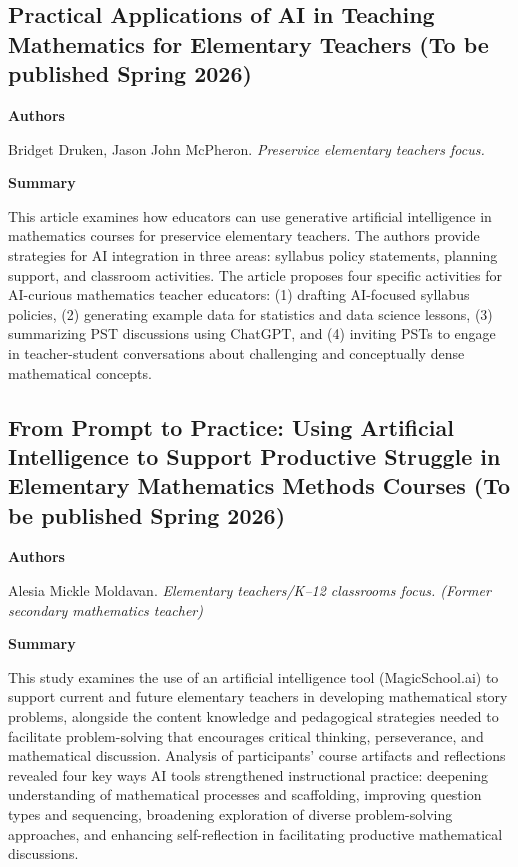 \documentclass[11pt, a4paper]{article}
\newenvironment{annotation}[1]
{\par\vspace{2pt}\noindent\textbf{#1}\par\vspace{1pt}\noindent\small\ignorespaces}
{\par\vspace{3pt}}
\begin{document}
\subsection[\texorpdfstring{Practical Applications of AI in Teaching Mathematics for Elementary Teachers }{Practical Applications of AI in Teaching Mathematics for Elementary Teachers }]{Practical Applications of AI in Teaching Mathematics for Elementary Teachers (To be published Spring 2026)}

\begin{annotation}{Authors}
Bridget Druken, Jason John McPheron. \textit{Preservice elementary teachers focus.}
\end{annotation}

\begin{annotation}{Summary}
This article examines how educators can use generative artificial intelligence in mathematics courses for preservice elementary teachers. The authors provide strategies for AI integration in three areas: syllabus policy statements, planning support, and classroom activities. The article proposes four specific activities for AI-curious mathematics teacher educators: (1) drafting AI-focused syllabus policies, (2) generating example data for statistics and data science lessons, (3) summarizing PST discussions using ChatGPT, and (4) inviting PSTs to engage in teacher-student conversations about challenging and conceptually dense mathematical concepts.
\end{annotation}


\subsection[\texorpdfstring{From Prompt to Practice: Using Artificial Intelligence to Support Productive Struggle in Elementary Mathematics Methods Courses }{From Prompt to Practice: Using Artificial Intelligence to Support Productive Struggle in Elementary Mathematics Methods Courses }]{From Prompt to Practice: Using Artificial Intelligence to Support Productive Struggle in Elementary Mathematics Methods Courses (To be published Spring 2026)}

\begin{annotation}{Authors}
Alesia Mickle Moldavan. \textit{Elementary teachers/K--12 classrooms focus. (Former secondary mathematics teacher)}
\end{annotation}

\begin{annotation}{Summary}
This study examines the use of an artificial intelligence tool (MagicSchool.ai) to support current and future elementary teachers in developing mathematical story problems, alongside the content knowledge and pedagogical strategies needed to facilitate problem-solving that encourages critical thinking, perseverance, and mathematical discussion. Analysis of participants' course artifacts and reflections revealed four key ways AI tools strengthened instructional practice: deepening understanding of mathematical processes and scaffolding, improving question types and sequencing, broadening exploration of diverse problem-solving approaches, and enhancing self-reflection in facilitating productive mathematical discussions.
\end{annotation}
\end{document}
